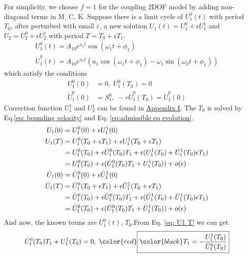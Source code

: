 \documentclass{article}
\begin{document}
For simplicity, we choose $f=1$ for the coupling 2DOF model by adding non-diagonal terms in M, C, K. Suppose there is a limit cycle of $U_1^0(t)$ with period $T_0$, after perturbed with small $\varepsilon$, a new solution $U_1(t)=U_1^0+\epsilon U_1^1$ and $U_2=U_2^0+\epsilon U_2^1$ with period $T=T_0+\epsilon T_1$.
\begin{align}
    U_1^0(t)=A_{10}e^{a_1 t}\cos(\omega_1 t +\phi_1)\\
    \dot{U}_1^0(t)=A_{10}e^{a_1 t}(a_1 \cos(\omega_1 t +\phi_1)-\omega_1 \sin(\omega_2 t+\phi_1))
\end{align}
which satisfy the conditions
\begin{align}
    U_1^0(0)&=0,\; U_1^0(T_0)=0\\
    \dot{U}_1^0(0)&=S_1^0, \; -r \dot{U}_1^0(T_0)=\dot{U}_1^0(0)
    \label{eq: LCO condition}
\end{align}
Correction function $U_1^1$ and $U_2^1$ can be found in \hyperref[Appendix I]{Appendix I}. The $T_0$ is solved by  Eq.\ref{eq: bounding velocity} and Eq. \ref{eq:admissible eq evolution}.
\begin{align}
    U_1(0)&=U_1^0(0)+\epsilon U_1^1(0) \vspace{1em} \\ \nonumber \label{eq: U1 T}
    U_1(T)&=U_1^0(T_0+\epsilon T_1)+\epsilon U_1^1(T_0+\epsilon T_1) \\  \nonumber 
    &= U_1^0(T_0)+\epsilon \dot{U}_1^0(T_0)T_1+\epsilon(U_1^1(T_0)+\dot{U}_1^1(T_0)\epsilon T_1)\\
    &=U_1^0(T_0)+\epsilon(\dot{U}_1^0(T_0)T_1+U_1^1(T_0))+ o (\epsilon)\\  \label{eq: V1 0}
    \dot{U}_1(0)&=\dot{U}_1^0(0)+\epsilon \dot{U}_1^1(0)   \\ \nonumber
    \dot{U}_1(T)&=\dot{U}_1^0(T_0+\epsilon T_1)+\epsilon \dot{U}_1^1(T_0+\epsilon T_1)\\ \nonumber
    &=\dot{U}_1^0(T_0)+\epsilon \ddot{U}_1^0(T_0)T_1+\epsilon(\dot{U}_1^1(T_0)+\ddot{U}_1^1(T_0)\epsilon T_1)\\ \label{eq: V1 T}
    &=\dot{U}_1^0(T_0)+\epsilon(\ddot{U}_1^0(T_0)T_1+\dot{U}_1^1(T_0))+ o (\epsilon)
\end{align}
And now, the known terms are $U_1^0(t)$, $T_0$.From Eq. \ref{eq: U1 T} we can get 
\begin{equation}
    \dot{U}_1^0(T_0)T_1+U_1^1(T_0)=0,\; {\color{red}\boxed{\color{black}T_1=-\frac{U_1^1(T_0)}{\dot{U}_1^0(T_0)}}}
    \label{eq: Period correction}
\end{equation} 
\end{document}
